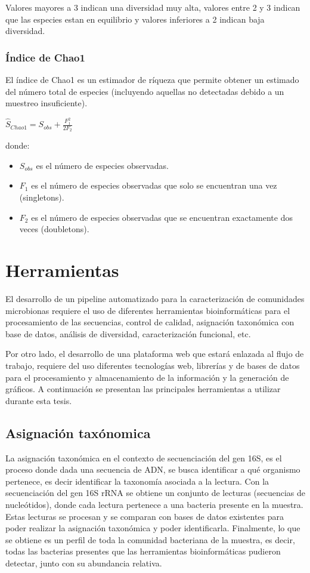Valores mayores a 3 indican una diversidad muy alta, valores entre 2 y 3 indican que las especies estan en equilibrio y valores inferiores a 2 indican baja diversidad.
\subsubsection{Índice de Chao1}
El índice de Chao1 es un estimador de ríqueza que permite obtener un estimado del número total de especies (incluyendo aquellas no detectadas debido a un muestreo insuficiente).
\begin{center}
    \begin{math}
\hat{S}_{Chao1} = S_{obs} + \frac{F_1^2}{2F_2}
\end{math}
\end{center}
donde:
\begin{itemize}
    \item $S_{obs}$ es el número de especies observadas.
    \item $F_1$ es el número de especies observadas que solo se encuentran una vez (singletons).
    \item $F_2$ es el número de especies observadas que se encuentran exactamente dos veces (doubletons).
\end{itemize}
\section{Herramientas}
El desarrollo de un pipeline automatizado para la caracterización de comunidades microbionas requiere el uso de diferentes herramientas bioinformáticas para el procesamiento de las secuencias, control de calidad, asignación taxonómica con base de datos, análisis de diversidad, caracterización funcional, etc. 

Por otro lado, el desarrollo de una plataforma web que estará enlazada al flujo de trabajo, requiere del uso diferentes tecnologías web, librerías y de bases de datos para el procesamiento y almacenamiento de la información y la generación de gráficos. A continuación se presentan las principales herramientas a utilizar durante esta tesis.
\subsection{Asignación taxónomica}
La asignación taxonómica en el contexto de secuenciación del gen 16S, es el proceso donde dada una secuencia de ADN, se busca identificar a qué organismo pertenece, es decir identificar la taxonomía asociada a la lectura.
Con la secuenciación del gen 16S rRNA se obtiene un conjunto de lecturas (secuencias de nucleótidos), donde cada lectura pertenece a una bacteria presente en la muestra. 
Estas lecturas se procesan y se comparan con bases de datos existentes para poder realizar la asignación taxonómica y poder identificarla. 
Finalmente, lo que se obtiene es un perfil de toda la comunidad bacteriana de la muestra, es decir, todas las bacterias presentes que las herramientas bioinformáticas pudieron detectar, junto con su abundancia relativa.



